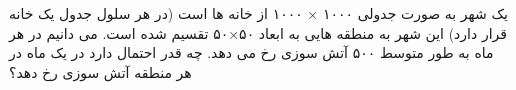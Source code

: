 \problem{}
یک شهر به صورت جدولی ۱۰۰۰ × ۱۰۰۰ از خانه ها است (در هر سلول جدول یک خانه قرار دارد) این
شهر به منطقه هایی به ابعاد ۵۰×۵۰ تقسیم شده است. می دانیم در هر ماه به طور متوسط ۵۰۰ آتش سوزی
رخ می دهد. چه قدر احتمال دارد در یک ماه در هر منطقه آتش سوزی رخ دهد؟